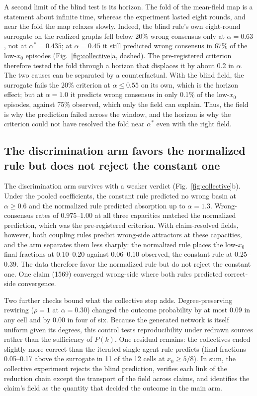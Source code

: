 \documentclass{ieeeaccess}
\newcommand{\astar}{\alpha^{*}}
\begin{document}
A second limit of the blind test is its horizon. The fold of the
mean-field map is a statement about infinite time, whereas the experiment
lasted eight rounds, and near the fold the map relaxes slowly. Indeed, the
blind rule's own eight-round surrogate on the realized graphs fell below
20\% wrong consensus only at $\alpha = 0.63$, not at $\astar = 0.435$; at
$\alpha = 0.45$ it still predicted wrong consensus in 67\% of the low-$x_0$
episodes (Fig.~\ref{fig:collective}a, dashed). The pre-registered
criterion therefore tested the fold through a horizon that displaces it by
about 0.2 in $\alpha$. The two causes can be separated by a counterfactual.
With the blind field, the surrogate fails the 20\% criterion at
$\alpha \le 0.55$ on its own, which is the horizon effect; but at
$\alpha = 1.0$ it predicts wrong consensus in only 0.1\% of the low-$x_0$
episodes, against 75\% observed, which only the field can explain. Thus,
the field is why the prediction failed across the window, and the horizon
is why the criterion could not have resolved the fold near $\astar$ even
with the right field.

\subsection{The discrimination arm favors the normalized rule but does not reject the constant one}

The discrimination arm survives with a weaker verdict
(Fig.~\ref{fig:collective}b). Under the pooled coefficients, the constant
rule predicted no wrong basin at $\alpha \ge 0.6$ and the normalized rule
predicted absorption up to $\alpha = 1.3$. Wrong-consensus rates of
0.975--1.00 at all three capacities matched the normalized prediction,
which was the pre-registered criterion. With claim-resolved fields,
however, both coupling rules predict wrong-side attractors at these
capacities, and the arm separates them less sharply: the normalized rule
places the low-$x_0$ final fractions at 0.10--0.20 against 0.06--0.10
observed, the constant rule at 0.25--0.39. The data therefore favor the
normalized rule but do not reject the constant one. One claim (1569)
converged wrong-side where both rules predicted correct-side convergence.

Two further checks bound what the collective step adds. Degree-preserving
rewiring ($\rho = 1$ at $\alpha = 0.30$) changed the outcome probability by
at most 0.09 in any cell and by 0.00 in four of six. Because the generated
network is itself uniform given its degrees, this control tests
reproducibility under redrawn sources rather than the sufficiency of
$P(k)$. One residual remains: the collectives ended slightly more correct
than the iterated single-agent rule predicts (final fractions 0.05--0.17
above the surrogate in 11 of the 12 cells at $x_0 \ge 5/8$). In sum, the
collective experiment rejects the blind prediction, verifies each link of
the reduction chain except the transport of the field across claims, and
identifies the claim's field as the quantity that decided the outcome in
the main arm.
\end{document}

